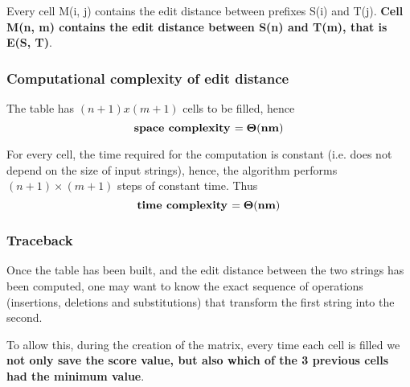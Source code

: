 \documentclass[../main.tex]{subfiles}
\begin{document}
Every cell M(i, j) contains the edit distance between prefixes S(i) and T(j). \textbf{Cell M(n, m) contains the edit distance between S(n) and T(m), that is E(S, T)}.

\subsubsection{Computational complexity of edit distance}

The table has $(n + 1) x (m + 1)$ cells to be filled, hence
$$
	\mbox{\textbf{space complexity }} \mathbf{= \Theta(nm)}
$$

For every cell, the time required for the computation is constant (i.e. does not depend on the size of input strings), hence, the algorithm performs $(n+1)\times(m+1)$ steps of constant time. Thus
$$
	\mbox{\textbf{time complexity }} \mathbf{= \Theta(nm)}
$$

\subsubsection{Traceback}

Once the table has been built, and the edit distance between the two strings has been computed, one may want to know the exact sequence of operations (insertions, deletions and substitutions) that transform the first string into the second.

To allow this, during the creation of the matrix, every time each cell is filled we \textbf{not only save the score value, but also which of the 3 previous cells had the minimum value}.
\end{document}
